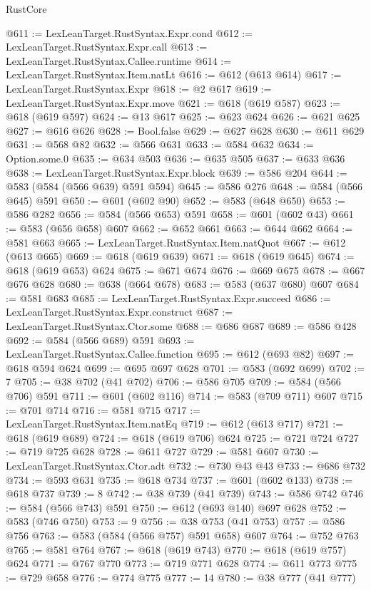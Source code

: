 \begin{lexlean}{RustCore}
\begin{coremodule}
@611 := LexLeanTarget.RustSyntax.Expr.cond
@612 := LexLeanTarget.RustSyntax.Expr.call
@613 := LexLeanTarget.RustSyntax.Callee.runtime
@614 := LexLeanTarget.RustSyntax.Item.natLt
@616 := @612 (@613 @614)
@617 := LexLeanTarget.RustSyntax.Expr
@618 := @2 @617
@619 := LexLeanTarget.RustSyntax.Expr.move
@621 := @618 (@619 @587)
@623 := @618 (@619 @597)
@624 := @13 @617
@625 := @623 @624
@626 := @621 @625
@627 := @616 @626
@628 := Bool.false
@629 := @627 @628
@630 := @611 @629
@631 := @568 @82
@632 := @566 @631
@633 := @584 @632
@634 := Option.some.{0}
@635 := @634 @503
@636 := @635 @505
@637 := @633 @636
@638 := LexLeanTarget.RustSyntax.Expr.block
@639 := @586 @204
@644 := @583 (@584 (@566 @639) @591 @594)
@645 := @586 @276
@648 := @584 (@566 @645) @591
@650 := @601 (@602 @90)
@652 := @583 (@648 @650)
@653 := @586 @282
@656 := @584 (@566 @653) @591
@658 := @601 (@602 @43)
@661 := @583 (@656 @658) @607
@662 := @652 @661
@663 := @644 @662
@664 := @581 @663
@665 := LexLeanTarget.RustSyntax.Item.natQuot
@667 := @612 (@613 @665)
@669 := @618 (@619 @639)
@671 := @618 (@619 @645)
@674 := @618 (@619 @653) @624
@675 := @671 @674
@676 := @669 @675
@678 := @667 @676 @628
@680 := @638 (@664 @678)
@683 := @583 (@637 @680) @607
@684 := @581 @683
@685 := LexLeanTarget.RustSyntax.Expr.succeed
@686 := LexLeanTarget.RustSyntax.Expr.construct
@687 := LexLeanTarget.RustSyntax.Ctor.some
@688 := @686 @687
@689 := @586 @428
@692 := @584 (@566 @689) @591
@693 := LexLeanTarget.RustSyntax.Callee.function
@695 := @612 (@693 @82)
@697 := @618 @594 @624
@699 := @695 @697 @628
@701 := @583 (@692 @699)
@702 := 7
@705 := @38 @702 (@41 @702)
@706 := @586 @705
@709 := @584 (@566 @706) @591
@711 := @601 (@602 @116)
@714 := @583 (@709 @711) @607
@715 := @701 @714
@716 := @581 @715
@717 := LexLeanTarget.RustSyntax.Item.natEq
@719 := @612 (@613 @717)
@721 := @618 (@619 @689)
@724 := @618 (@619 @706) @624
@725 := @721 @724
@727 := @719 @725 @628
@728 := @611 @727
@729 := @581 @607
@730 := LexLeanTarget.RustSyntax.Ctor.adt
@732 := @730 @43 @43
@733 := @686 @732
@734 := @593 @631
@735 := @618 @734
@737 := @601 (@602 @133)
@738 := @618 @737
@739 := 8
@742 := @38 @739 (@41 @739)
@743 := @586 @742
@746 := @584 (@566 @743) @591
@750 := @612 (@693 @140) @697 @628
@752 := @583 (@746 @750)
@753 := 9
@756 := @38 @753 (@41 @753)
@757 := @586 @756
@763 := @583 (@584 (@566 @757) @591 @658) @607
@764 := @752 @763
@765 := @581 @764
@767 := @618 (@619 @743)
@770 := @618 (@619 @757) @624
@771 := @767 @770
@773 := @719 @771 @628
@774 := @611 @773
@775 := @729 @658
@776 := @774 @775
@777 := 14
@780 := @38 @777 (@41 @777)

\end{coremodule}
\end{lexlean}
